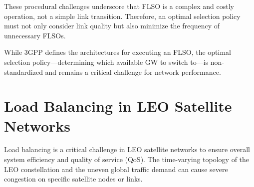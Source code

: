 These procedural challenges underscore that FLSO is a complex and costly operation, not a simple link transition. Therefore, an optimal selection policy must not only consider link quality but also minimize the frequency of unnecessary FLSOs.

While 3GPP defines the architectures for executing an FLSO, the optimal selection policy—determining which available GW to switch to—is non-standardized and remains a critical challenge for network performance.
\section[Load Balancing in LEO Satellite Networks]{Load Balancing in LEO Satellite Networks} \label{sec:related_load_balancing} 
\quad Load balancing is a critical challenge in LEO satellite networks to ensure overall system efficiency and quality of service (QoS). The time-varying topology of the LEO constellation and the uneven global traffic demand can cause severe congestion on specific satellite nodes or links. %

